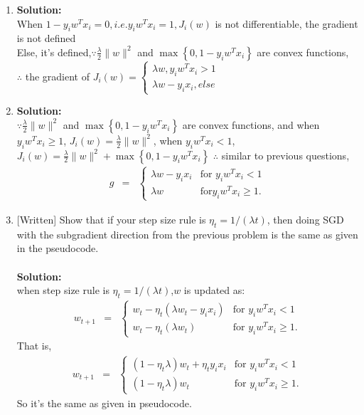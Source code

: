 \documentclass[ruled]{article}
\begin{document}
\begin{enumerate}

\item 
\textbf{Solution:}\\
When $1-y_{i}w^{T}x_{i}=0, i.e.y_{i}w^{T}x_{i}=1, J_{i}(w)$ is not differentiable, the gradient is not defined\\
Else, it's defined,$\because \frac{\lambda}{2}\|w\|^{2}$ and $\max\left\{ 0,1-y_{i}w^{T}x_{i}\right\}$ are  convex functions,\\
$\therefore$ the gradient of $J_{i}(w) = {\left\{
\begin{aligned}
\lambda w, y_{i}w^T x_{i} > 1\\
\lambda w - y_{i}x_{i}, else
\end{aligned}\right.}$

\item 
\textbf{Solution:}\\

$\because \frac{\lambda}{2}\|w\|^{2}$ and $\max\left\{ 0,1-y_{i}w^{T}x_{i}\right\}$ are  convex functions,
and when $y_{i}w^{T}x_{i}\ge1$,  $J_{i}(w)=\frac{\lambda}{2}\|w\|^{2}$, when $y_{i}w^{T}x_{i}<1$,$J_{i}(w)=\frac{\lambda}{2}\|w\|^{2}+\max\left\{ 0,1-y_{i}w^{T}x_{i}\right\}$
$\therefore$ similar to previous questions,
\begin{eqnarray*}
g & = & \begin{cases}
\lambda w-y_{i}x_{i} & \mbox{for }y_{i}w^{T}x_{i}<1\\
\lambda w & \mbox{for}y_{i}w^{T}x_{i}\ge1.
\end{cases}
\end{eqnarray*}


\item {[}Written{]} Show that if your step size rule is $\eta_{t}=1/\left(\lambda t\right)$,
then doing SGD with the subgradient direction from the previous problem
is the same as given in the pseudocode. \\
\\\textbf{Solution:}\\
when step size rule is $\eta_{t}=1/\left(\lambda t\right)$,$w$ is updated as:
\begin{eqnarray*}
w_{t+1} & = & \begin{cases}
w_{t} -\eta_{t}(\lambda w_{t}-y_{i}x_{i}) & \mbox{for }y_{i}w^{T}x_{i}<1\\
w_{t} -\eta_{t}(\lambda w_{t})  & \mbox{for }y_{i}w^{T}x_{i}\ge1.
\end{cases}
\end{eqnarray*}
That is,
\begin{eqnarray*}
w_{t+1} & = & \begin{cases}
(1-\eta_{t}\lambda)w_{t}+\eta_{t}y_{i}x_{i} & \mbox{for }y_{i}w^{T}x_{i}<1\\
(1-\eta_{t}\lambda)w_{t}  & \mbox{for }y_{i}w^{T}x_{i}\ge1.
\end{cases}
\end{eqnarray*}
So it's the same as given in pseudocode.

\end{enumerate}
\end{document}
